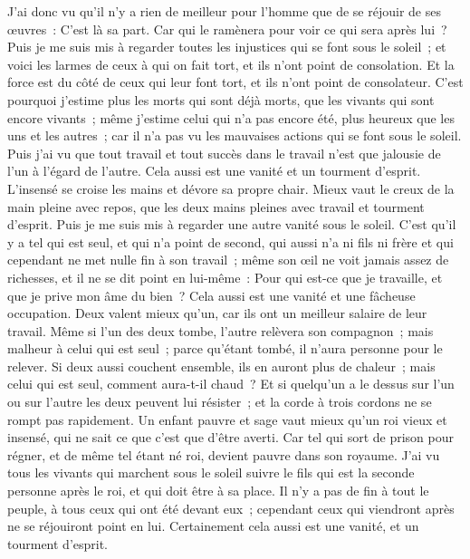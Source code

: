 \begin{multicols}{2}
J'ai donc vu qu'il n'y a rien de meilleur pour l'homme que de se réjouir de ses œuvres~: C'est là sa part. Car qui le ramènera pour voir ce qui sera après lui~?
\VerseOne{}Puis je me suis mis à regarder toutes les injustices qui se font sous le soleil~; et voici les larmes de ceux à qui on fait tort, et ils n'ont point de consolation. Et la force est du côté de ceux qui leur font tort, et ils n'ont point de consolateur. 
C'est pourquoi j'estime plus les morts qui sont déjà morts, que les vivants qui sont encore vivants~;
même j'estime celui qui n'a pas encore été, plus heureux que les uns et les autres~; car il n'a pas vu les mauvaises actions qui se font sous le soleil.
Puis j'ai vu que tout travail et tout succès dans le travail n'est que jalousie de l'un à l'égard de l'autre. Cela aussi est une vanité et un tourment d'esprit. 
L'insensé se croise les mains et dévore sa propre chair.
Mieux vaut le creux de la main pleine avec repos, que les deux mains pleines avec travail et tourment d'esprit. 
Puis je me suis mis à regarder une autre vanité sous le soleil. 
C'est qu'il y a tel qui est seul, et qui n'a point de second, qui aussi n'a ni fils ni frère et qui cependant ne met nulle fin à son travail~; même son œil ne voit jamais assez de richesses, et il ne se dit point en lui-même~: Pour qui est-ce que je travaille, et que je prive mon âme du bien~? Cela aussi est une vanité et une fâcheuse occupation.
Deux valent mieux qu'un, car ils ont un meilleur salaire de leur travail.
Même si l'un des deux tombe, l'autre relèvera son compagnon~; mais malheur à celui qui est seul~; parce qu'étant tombé, il n'aura personne pour le relever. 
Si deux aussi couchent ensemble, ils en auront plus de chaleur~; mais celui qui est seul, comment aura-t-il chaud~? 
Et si quelqu'un a le dessus sur l'un ou sur l'autre les deux peuvent lui résister~; et la corde à trois cordons ne se rompt pas rapidement.
Un enfant pauvre et sage vaut mieux qu'un roi vieux et insensé, qui ne sait ce que c'est que d'être averti.
Car tel qui sort de prison pour régner, et de même tel étant né roi, devient pauvre dans son royaume.
J'ai vu tous les vivants qui marchent sous le soleil suivre le fils qui est la seconde personne après le roi, et qui doit être à sa place. 
Il n'y a pas de fin à tout le peuple, à tous ceux qui ont été devant eux~; cependant ceux qui viendront après ne se réjouiront point en lui. Certainement cela aussi est une vanité, et un tourment d'esprit. 

\end{multicols}
